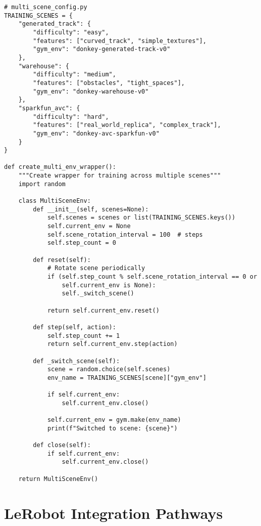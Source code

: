 \documentclass[11pt,a4paper]{article}
\begin{document}
\begin{lstlisting}[style=pythonstyle, caption={Multi-scene configuration}]
# multi_scene_config.py
TRAINING_SCENES = {
    "generated_track": {
        "difficulty": "easy",
        "features": ["curved_track", "simple_textures"],
        "gym_env": "donkey-generated-track-v0"
    },
    "warehouse": {
        "difficulty": "medium", 
        "features": ["obstacles", "tight_spaces"],
        "gym_env": "donkey-warehouse-v0"
    },
    "sparkfun_avc": {
        "difficulty": "hard",
        "features": ["real_world_replica", "complex_track"],
        "gym_env": "donkey-avc-sparkfun-v0"
    }
}

def create_multi_env_wrapper():
    """Create wrapper for training across multiple scenes"""
    import random
    
    class MultiSceneEnv:
        def __init__(self, scenes=None):
            self.scenes = scenes or list(TRAINING_SCENES.keys())
            self.current_env = None
            self.scene_rotation_interval = 100  # steps
            self.step_count = 0
            
        def reset(self):
            # Rotate scene periodically
            if (self.step_count % self.scene_rotation_interval == 0 or 
                self.current_env is None):
                self._switch_scene()
            
            return self.current_env.reset()
            
        def step(self, action):
            self.step_count += 1
            return self.current_env.step(action)
            
        def _switch_scene(self):
            scene = random.choice(self.scenes)
            env_name = TRAINING_SCENES[scene]["gym_env"]
            
            if self.current_env:
                self.current_env.close()
                
            self.current_env = gym.make(env_name)
            print(f"Switched to scene: {scene}")
            
        def close(self):
            if self.current_env:
                self.current_env.close()
    
    return MultiSceneEnv()
\end{lstlisting}

\section{LeRobot Integration Pathways}
\end{document}
